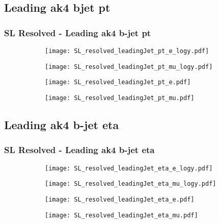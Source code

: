 \documentclass[aspectratio=169,8pt]{beamer}
\begin{document}
\subsection{Leading ak4 bjet pt}
\begin{frame}
\frametitle{SL Resolved - Leading ak4 b-jet pt}
\begin{figure}
\captionsetup[subfigure]{labelformat=empty}
\begin{subfigure}{0.375\textwidth}
\texttt{[image: SL\_resolved\_leadingJet\_pt\_e\_logy.pdf]}
\vspace*{-0.15cm}
\end{subfigure}
\hfil
\begin{subfigure}{0.375\textwidth}
\texttt{[image: SL\_resolved\_leadingJet\_pt\_mu\_logy.pdf]}
\vspace*{-0.15cm}
\end{subfigure}
\hfil
\begin{subfigure}{0.375\textwidth}
\texttt{[image: SL\_resolved\_leadingJet\_pt\_e.pdf]}
\vspace*{-0.15cm}
\end{subfigure}
\hfil
\begin{subfigure}{0.375\textwidth}
\texttt{[image: SL\_resolved\_leadingJet\_pt\_mu.pdf]}
\vspace*{-0.15cm}
\end{subfigure}
\hfil
\end{figure}
\end{frame}
\newpage

\subsection{Leading ak4 b-jet eta}
\begin{frame}
\frametitle{SL Resolved - Leading ak4 b-jet eta}
\begin{figure}
\captionsetup[subfigure]{labelformat=empty}
\begin{subfigure}{0.375\textwidth}
\texttt{[image: SL\_resolved\_leadingJet\_eta\_e\_logy.pdf]}
\vspace*{-0.15cm}
\end{subfigure}
\hfil
\begin{subfigure}{0.375\textwidth}
\texttt{[image: SL\_resolved\_leadingJet\_eta\_mu\_logy.pdf]}
\vspace*{-0.15cm}
\end{subfigure}
\hfil
\begin{subfigure}{0.375\textwidth}
\texttt{[image: SL\_resolved\_leadingJet\_eta\_e.pdf]}
\vspace*{-0.15cm}
\end{subfigure}
\hfil
\begin{subfigure}{0.375\textwidth}
\texttt{[image: SL\_resolved\_leadingJet\_eta\_mu.pdf]}
\vspace*{-0.15cm}
\end{subfigure}
\hfil
\end{figure}
\end{frame}
\newpage
\end{document}
